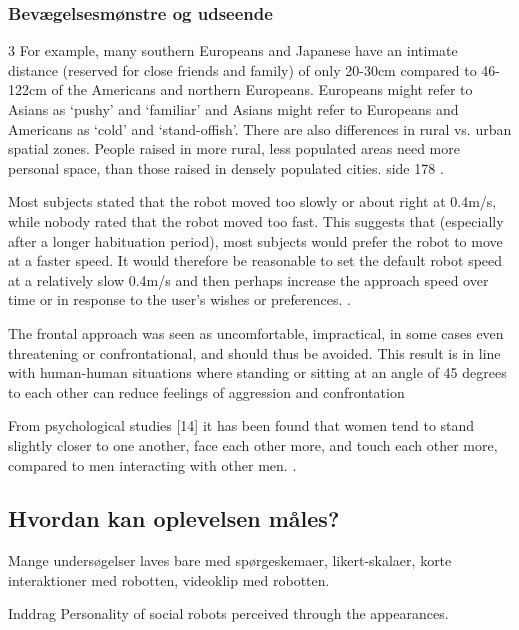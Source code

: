 \subsubsection{Bevægelsesmønstre og udseende}
\label{InteraktionSocialeRobotterParametreBevaegelsesmoenstre}
%


3 For example, many southern Europeans and Japanese have an intimate distance (reserved for close friends and family) of only 20-30cm compared to 46-122cm of the Americans and northern Europeans. Europeans might refer to Asians as ‘pushy’ and ‘familiar’ and Asians might refer to Europeans and Americans as ‘cold’ and ‘stand-offish’. There are also differences in rural vs. urban spatial zones. People raised in more rural, less populated areas need more personal space, than those raised in densely populated cities. side 178 \textcite[s. 178]{PDF:HowMayIServeYou}.

Most subjects stated that the robot moved too slowly or about right at 0.4m/s, while nobody rated that the robot moved too fast. This suggests that (especially after a longer habituation period), most subjects would prefer the robot to move at a faster speed. It would therefore be reasonable to set the default robot speed at a relatively slow 0.4m/s and then perhaps increase the approach speed over time or in response to the user’s wishes or preferences. \textcite[s. 178]{PDF:HowMayIServeYou}. 

The frontal approach was seen as uncomfortable, impractical, in some cases even threatening or confrontational, and should thus be avoided. This result is in line with human-human situations where standing or sitting at an angle of 45 degrees to each other can reduce feelings of aggression and confrontation \textcite[s. 178]{PDF:HowMayIServeYou}

From psychological studies [14] it has been found that women tend to stand slightly closer to one another, face each other more, and touch each other more, compared to men interacting with other men. \textcite[s. 178]{PDF:HowMayIServeYou}. 

\subsection{Hvordan kan oplevelsen måles?}
\label{InteraktionSocialeRobotterOplevelse}
%
Mange undersøgelser laves bare med spørgeskemaer, likert-skalaer, korte interaktioner med robotten, videoklip med robotten. 

Inddrag Personality of social robots perceived through the appearances.












